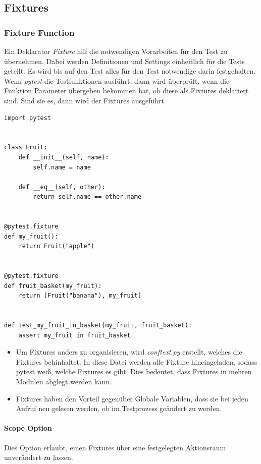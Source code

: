\subsection{Fixtures}

\subsubsection{Fixture Function}
Ein Deklarator \textit{Fixture} hilf die notwendigen Vorarbeiten für den Test zu übernehmen. Dabei werden Definitionen und Settings einheitlich für die Tests geteilt. 
Es wird bis auf den Test alles für den Test notwendige darin festgehalten. Wenn \textit{pytest} die Testfunktionen ausführt, dann wird überprüft, wenn die Funktion Parameter übergeben bekommen hat, ob diese als Fixtures deklariert sind. Sind sie es, dann wird der Fixtures ausgeführt.

\begin{lstlisting}[style=python, caption={Beispiel pyproject.toml; Slapping pytest config}, captionpos=b]
import pytest


class Fruit:
    def __init__(self, name):
        self.name = name

    def __eq__(self, other):
        return self.name == other.name


@pytest.fixture
def my_fruit():
    return Fruit("apple")


@pytest.fixture
def fruit_basket(my_fruit):
    return [Fruit("banana"), my_fruit]


def test_my_fruit_in_basket(my_fruit, fruit_basket):
    assert my_fruit in fruit_basket
\end{lstlisting}

\begin{itemize}
	\item Um Fixtures anders zu organisieren, wird \textit{conftext.py} erstellt, welches die Fixtures behinhaltet. In diese Datei werden alle Fixture hineingeladen, sodass pytest weiß, welche Fixtures es gibt. Dies bedeutet, dass Fixtures in mehren Modulen abglegt werden kann.
	\item Fixtures haben den Vorteil gegenüber Globale Variablen, dass sie bei jeden Aufruf neu gelesen werden, ob im Testprozess geändert zu werden.
\end{itemize}
\paragraph{Scope Option}
Dies Option erlaubt, einen Fixtures über eine festgelegten Aktionsraum unverändert zu lassen. 

